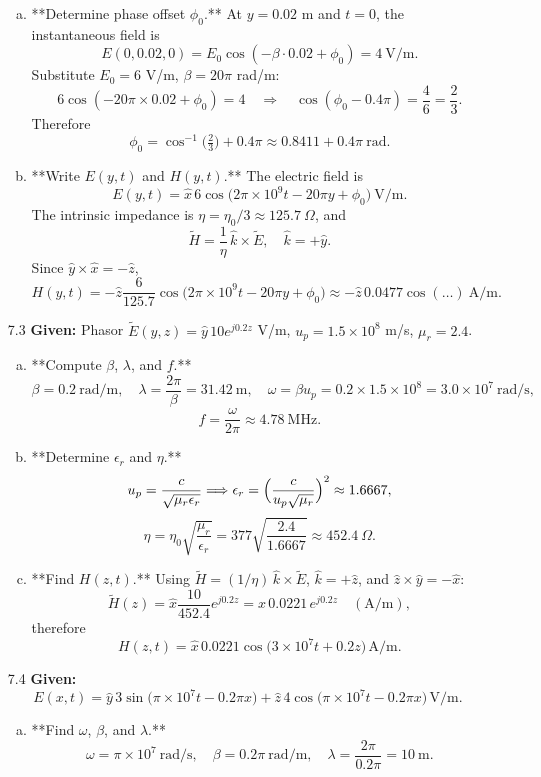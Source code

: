 \begin{enumerate}
\begin{enumerate}[(a)]
  \item **Determine phase offset $\phi_0$.**  At $y=0.02$ m and $t=0$, the instantaneous field is
  \[
    E(0,0.02,0)=E_0\cos(-\beta\cdot0.02+\phi_0)=4~\mathrm{V/m}.
  \]
  Substitute $E_0=6$ V/m, $\beta=20\pi$ rad/m:
  \[
    6\cos(-20\pi\times0.02+\phi_0)=4
    \quad\Longrightarrow\quad
    \cos(\phi_0-0.4\pi)=\frac{4}{6}=\frac{2}{3}.
  \]
  Therefore
  \[
    \phi_0 = \cos^{-1}\bigl(\tfrac23\bigr) + 0.4\pi \approx 0.8411 + 0.4\pi~\mathrm{rad}.
  \]

  \item **Write $E(y,t)$ and $H(y,t)$.**  The electric field is
  \[
    E(y,t)=\hat x\,6\cos\bigl(2\pi\times10^9t-20\pi y+\phi_0\bigr)~\mathrm{V/m}.
  \]
  The intrinsic impedance is $\eta=\eta_0/3\approx125.7~\Omega$, and
  \[
    \tilde H = \frac{1}{\eta}\,\hat k\times\tilde E,\quad \hat k=+\hat y.
  \]
  Since $\hat y\times\hat x=-\hat z$,
  \[
    H(y,t)=-\hat z\frac{6}{125.7}\cos\bigl(2\pi\times10^9t-20\pi y+\phi_0\bigr)
    \approx -\hat z\,0.0477\cos(\dots)~\mathrm{A/m}.
  \]
\end{enumerate}

\item[7.3] \textbf{Given:} Phasor $\tilde E(y,z)=\hat y\,10e^{j0.2z}$ V/m, $u_p=1.5\times10^8$ m/s, $\mu_r=2.4$.  
\begin{enumerate}[(a)]
  \item **Compute $\beta$, $\lambda$, and $f$.**  
  \[
    \beta=0.2~\mathrm{rad/m},\quad \lambda=\frac{2\pi}{\beta}=31.42~\mathrm{m},\quad
    \omega=\beta u_p=0.2\times1.5\times10^8=3.0\times10^7~\mathrm{rad/s},
  \]
  \[
    f=\frac{\omega}{2\pi}\approx4.78~\mathrm{MHz}.
  \]

  \item **Determine $\epsilon_r$ and $\eta$.**  
  \[
    u_p=\frac{c}{\sqrt{\mu_r\epsilon_r}}\Longrightarrow\epsilon_r=\Bigl(\frac{c}{u_p\sqrt{\mu_r}}\Bigr)^2
    \approx1.6667,
  \]
  \[
    \eta=\eta_0\sqrt{\frac{\mu_r}{\epsilon_r}}
    =377\sqrt{\frac{2.4}{1.6667}}\approx452.4~\Omega.
  \]

  \item **Find $H(z,t)$.**  
  Using $\tilde H=(1/\eta)\,\hat k\times\tilde E$, $\hat k=+\hat z$, and $\hat z\times\hat y=-\hat x$:
  \[
    \tilde H(z)=\hat x\frac{10}{452.4}e^{j0.2z}=\hat x\,0.0221\,e^{j0.2z}\quad(\mathrm{A/m}),
  \]
  therefore
  \[
    H(z,t)=\hat x\,0.0221\cos\bigl(3\times10^7t+0.2z\bigr)\mathrm{\,A/m}.
  \]
\end{enumerate}

\item[7.4] \textbf{Given:}
\[E(x,t)=\hat y\,3\sin\bigl(\pi\times10^7t-0.2\pi x\bigr)
+\hat z\,4\cos\bigl(\pi\times10^7t-0.2\pi x\bigr)\mathrm{\,V/m}.\]
\begin{enumerate}[(a)]
  \item **Find $\omega$, $\beta$, and $\lambda$.**
  \[
    \omega=\pi\times10^7~\mathrm{rad/s},\quad
    \beta=0.2\pi~\mathrm{rad/m},\quad
    \lambda=\frac{2\pi}{0.2\pi}=10~\mathrm{m}.
  \]


\end{enumerate}
\end{enumerate}
